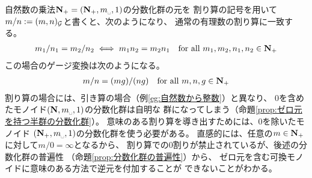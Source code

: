 	\begin{example}[自然数から有理数]\label{eg:自然数から有理数} %
		自然数の乗法$\sizen_+=(\sizen_+,m_\myspace,1)$の分数化群の元を
		割り算の記号を用いて$m/n:=(m,n)_{{\mathcal{G}}}$と書くと、次のようになり、
		通常の有理数の割り算に一致する。
		\begin{equation*}\begin{split}
			m_1/n_1 = m_2/n_2 \iff m_1n_2 = m_2n_1
			\quad\text{for all }m_1,m_2,n_1,n_2\in \mathbf{N}_+
		\end{split}\end{equation*}
		この場合のゲージ変換は次のようになる。
		\begin{equation*}\begin{split}
			m / n = (m g) / (n g) \quad\text{for all }m,n,g\in \mathbf{N}_+
		\end{split}\end{equation*}
		割り算の場合には、引き算の場合（例\ref{eg:自然数から整数}）と異なり、
		$0$を含めたモノイド$(\sizen,m_\myspace,1)$の分数化群は自明な
		群になってしまう（命題\ref{prop:ゼロ元を持つ半群の分数化群}）。
		意味のある割り算を導き出すためには、$0$を除いたモノイド
		$(\sizen_+,m_\myspace,1)$の分数化群を使う必要がある。
		直感的には、任意の$m\in\mathbf{N}_+$に対して$m/0=\infty$となるから、
		割り算での$0$割りが禁止されているが、後述の分数化群の普遍性
		（命題\ref{prop:分数化群の普遍性}）から、
		ゼロ元を含む可換モノイドに意味のある方法で逆元を付加することが
		できないことがわかる。
	\end{example} %

